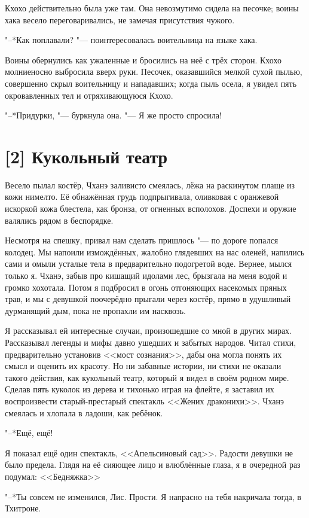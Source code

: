 Кхохо действительно была уже там.
Она невозмутимо сидела на песочке;
воины хака весело переговаривались, не замечая присутствия чужого.

"--*Как поплавали? "--- поинтересовалась воительница на языке хака.

Воины обернулись как ужаленные и бросились на неё с трёх сторон.
Кхохо молниеносно выбросила вверх руки.
Песочек, оказавшийся мелкой сухой пылью, совершенно скрыл воительницу и нападавших;
когда пыль осела, я увидел пять окровавленных тел и отряхивающуюся Кхохо.

"--*Придурки, "--- буркнула она.
"--- Я же просто спросила!

\section{[2] Кукольный театр}

Весело пылал костёр, Чханэ заливисто смеялась, лёжа на раскинутом плаще из кожи нимелто.
Её обнажённая грудь подпрыгивала, оливковая с оранжевой искоркой кожа блестела, как бронза, от огненных всполохов.
Доспехи и оружие валялись рядом в беспорядке.

Несмотря на спешку, привал нам сделать пришлось "--- по дороге попался колодец.
Мы напоили измождённых, жалобно глядевших на нас оленей, напились сами и омыли усталые тела в предварительно подогретой воде.
Вернее, мылся только я.
Чханэ, забыв про кишащий идолами лес, брызгала на меня водой и громко хохотала.
Потом я подбросил в огонь отгоняющих насекомых пряных трав, и мы с девушкой поочерёдно прыгали через костёр, прямо в удушливый дурманящий дым, пока не пропахли им насквозь.

Я рассказывал ей интересные случаи, произошедшие со мной в других мирах.
Рассказывал легенды и мифы давно ушедших и забытых народов.
Читал стихи, предварительно установив <<мост сознания>>, дабы она могла понять их смысл и оценить их красоту.
Но ни забавные истории, ни стихи не оказали такого действия, как кукольный театр, который я видел в своём родном мире.
Сделав пять куколок из дерева и тихонько играя на флейте, я заставил их воспроизвести старый-престарый спектакль <<Жених драконихи>>.
Чханэ смеялась и хлопала в ладоши, как ребёнок.

"--*Ещё, ещё!

Я показал ещё один спектакль, <<Апельсиновый сад>>.
Радости девушки не было предела.
Глядя на её сияющее лицо и влюблённые глаза, я в очередной раз подумал: <<Бедняжка\ldotst>>

"--*Ты совсем не изменился, Лис.
Прости.
Я напрасно на тебя накричала тогда, в Тхитроне.

